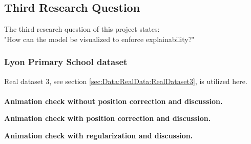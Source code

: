 \subsection{Third Research Question}
\label{sec:ResearchQuestion3}
The third research question of this project states:
\\
"How can the model be visualized to enforce explainability?"



\subsubsection{Lyon Primary School dataset}
\label{sec:ResearchQuestion3:LyonDataset}

Real dataset 3, see section \ref{sec:Data:RealData:RealDataset3}, is utilized here.
\\\\
\textbf{Animation check without position correction and discussion.}


\textbf{Animation check with position correction and discussion.}


\textbf{Animation check with regularization and discussion.}



